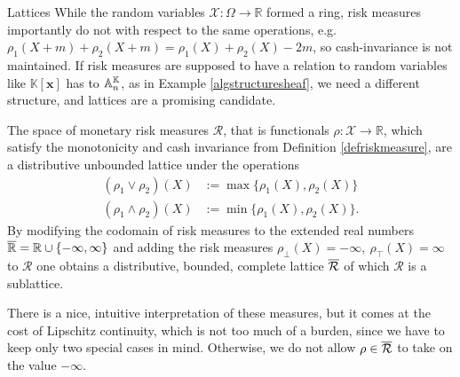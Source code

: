 \begin{subsection}{Lattices}
    While the random variables \( \mathcal{X} : \Omega \to \mathbb{R} \) formed a ring, risk measures importantly do not with respect to 
    the same operations, e.g. \( \rho_1(X + m) + \rho_2(X + m) = \rho_1(X) + \rho_2(X) - 2m \), so cash-invariance is not maintained. 
    If risk measures are supposed to have a relation to random variables like \( \mathbb{K}[\mathbf{x}] \) has to \( \mathbb{A}^{\mathbb{K}}_{n} \),
    as in Example \ref{algstructuresheaf}, we need a different structure, and lattices are a promising candidate.
    \begin{theorem} \label{monrmarelattice}
        The space of monetary risk measures \( \mathcal{R} \), that is functionals \( \rho : \mathcal{X} \to \mathbb{R} \), which satisfy
        the monotonicity and cash invariance from Definition \ref{defriskmeasure}, are a distributive unbounded lattice under the operations 
        \begin{align*}
            (\rho_1 \vee \rho_2)(X) &:= \max \{\rho_1(X), \rho_2(X) \} \\
            (\rho_1 \wedge \rho_2)(X) &:= \min \{\rho_1(X), \rho_2(X) \}.
        \end{align*}
        By modifying the codomain of risk measures to the extended real numbers \( \overline{\mathbb{R}} = \mathbb{R} \cup \{ -\infty, \infty \} \)
        and adding the risk measures \( \rho_{\bot}(X) = -\infty,\ \rho_{\top}(X) = \infty \) to \( \mathcal{R} \) one obtains a distributive,
        bounded, complete lattice \( \overline{\mathcal{R}} \) of which \( \mathcal{R} \) is a sublattice.
    \end{theorem}
    \begin{remark} \label{completionofriskmeasures}
        There is a nice, intuitive interpretation of these measures, but it comes at the cost of Lipschitz continuity, which is not too much of a burden, 
        since we have to keep only two special cases in mind. Otherwise, we do not allow \( \rho \in \overline{\mathcal{R}} \) to take on the value \( - \infty \).
    \end{remark}


\end{subsection}
